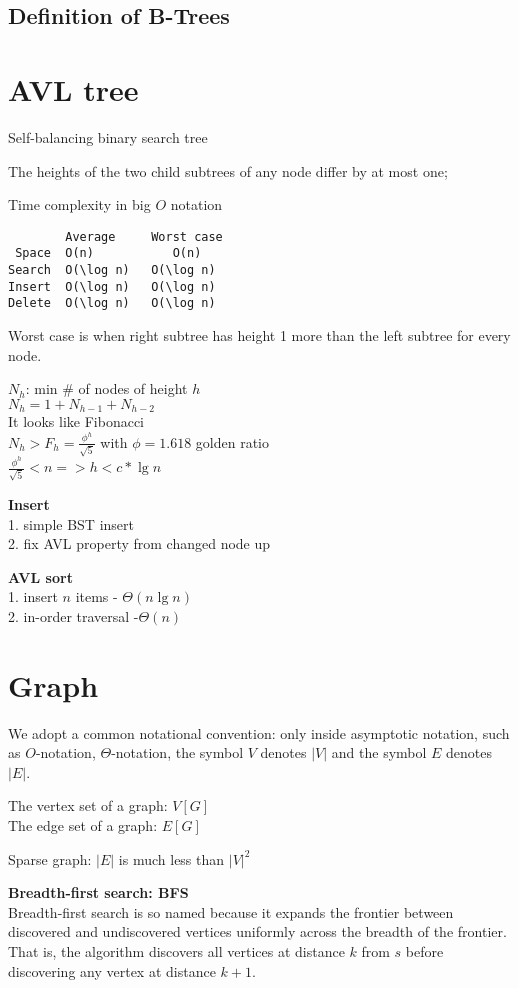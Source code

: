 \documentclass{article}
\begin{document}
\subsection{Definition of B-Trees}
\section{AVL tree}
\noindent
Self-balancing binary search tree

The heights of the two child subtrees of any node differ by at most one;

Time complexity in big $O$ notation
\begin{verbatim}
        Average  	Worst case
 Space	O(n)	       O(n)
Search	O(\log n)	O(\log n)
Insert	O(\log n)	O(\log n)
Delete	O(\log n)	O(\log n)
\end{verbatim}

Worst case is when right subtree has height  1 more than the left subtree for every node.

\noindent
$N_h$: min \# of nodes of height $h$\\
$N_h = 1+ N_{h-1} + N_{h-2}$\\
It looks like Fibonacci\\
$N_h > F_h = \frac{\phi^h}{\sqrt{5}}$ with $\phi = 1.618$  golden ratio\\
 $\frac{\phi^h}{\sqrt{5}} < n => h < c * \lg n$

\textbf{Insert}\\
1. simple BST insert\\
2. fix AVL property from changed node up

\textbf{AVL sort}\\
1. insert $n$ items - $\Theta(n\lg n)$\\
2. in-order traversal -$\Theta(n)$
\section{Graph}
We adopt a common notational convention: only inside asymptotic notation, such as $O$-notation, $\Theta$-notation, the symbol $V$ denotes $|V|$ and the symbol $E$ denotes $|E|$.

\noindent
The vertex set of a graph: $V[G]$\\
The edge set of a graph: $E[G]$

Sparse graph: $|E|$ is much less than $|V|^2$

\textbf{Breadth-first search: BFS}\\
Breadth-first search is so named because it expands the frontier between discovered and undiscovered vertices uniformly across the breadth of the frontier. That is, the algorithm discovers all vertices at distance $k$ from $s$ before discovering any vertex at distance $k+1$.
\end{document}

